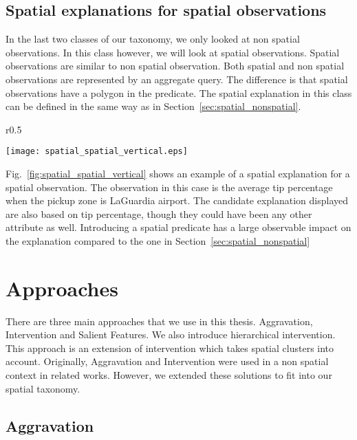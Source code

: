 \subsection{Spatial explanations for spatial observations}
\label{sec:spatial_spatial}
In the last two classes of our taxonomy, we only looked at non spatial observations. In this class however, we will look at spatial observations. Spatial observations are similar to non spatial observation. Both spatial and non spatial observations are represented by an aggregate query. The difference is that spatial observations have a polygon in the predicate. The spatial explanation in this class can be defined in the same way as in Section~\ref{sec:spatial_nonspatial}. 

\begin{wrapfigure}{r}{0.5\textwidth}
  \begin{center}
    \texttt{[image: spatial\_spatial\_vertical.eps]}
  \end{center}
  \caption{An example of spatial explanation for a spatial observation}
\label{fig:spatial_spatial_vertical}
\end{wrapfigure}



Fig.~\ref{fig:spatial_spatial_vertical} shows an example of a spatial explanation for a spatial observation. The observation in this case is the average tip percentage when the pickup zone is LaGuardia airport. The candidate explanation displayed are also based on tip percentage, though they could have been any other attribute as well. Introducing a spatial predicate has a large observable impact on the explanation compared to the one in Section~\ref{sec:spatial_nonspatial}


\section{Approaches}
\label{sec:approaches}
There are three main approaches that we use in this thesis. Aggravation, Intervention and Salient Features. We also introduce hierarchical intervention. This approach is an extension of intervention which takes spatial clusters into account. Originally, Aggravation and Intervention were used in a non spatial context in related works\citep{chirigati2016data}. However, we extended these solutions to fit into our spatial taxonomy. 

\subsection{Aggravation}
\label{sec:aggravation}

